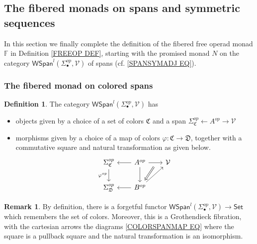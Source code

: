 \documentclass[a4paper,10pt
,draft
]{article}%
\numberwithin{equation}{section}
\numberwithin{figure}{section}
\theoremstyle{definition} %
\newtheorem{definition}[equation]{Definition}%
\newtheorem{remark}[equation]{Remark}%
\newcommand{\1}{\ensuremath{\mathbbm 1}}%
\begin{document}
\subsection{The fibered monads on spans and symmetric sequences} \label{NONEQMON SEC}

In this section we finally complete the definition of the fibered free operad monad
$\mathbb{F}$ in Definition \ref{FREEOP DEF},
starting with the promised monad $N$ on the category $\mathsf{WSpan}^l(\Sigma_{\bullet}^{op},\mathcal{V})$ of spans
(cf. \eqref{SPANSYMADJ EQ}).


\subsubsection*{The fibered monad on colored spans}



\begin{definition}\label{WSPANCAT DEF}
	The category $\mathsf{WSpan}^l(\Sigma_{\bullet}^{op},\mathcal{V})$ has
	\begin{itemize}
		\item objects given by a choice of a set of colors $\mathfrak{C}$
		and a span $\Sigma^{op}_{\mathfrak{C}} \leftarrow A^{op} \rightarrow \mathcal{V}$
		\item morphisms given by a choice of a map of colors
		$\varphi \colon \mathfrak{C} \to \mathfrak{D}$,
		together with a commutative square and natural transformation as given below.
		\begin{equation}\label{COLORSPANMAP EQ}
		\begin{tikzcd}[column sep = 20pt]
		\Sigma_{\mathfrak{C}}^{op}
		\ar{d}[swap]{\varphi^{op}} &
		A^{op}
		\ar{r}[name=U,swap]{} \ar{d} \ar{l} &
		\mathcal{V}	
		\\
		\Sigma_{\mathfrak{D}}^{op}
		&
		|[alias=V]|
		B^{op} \ar{l}
		\ar{ru}
		\arrow[Leftarrow, from=V, to=U,shorten >=0.05cm,shorten <=0.1cm]
		\end{tikzcd}
		\end{equation}
	\end{itemize}
\end{definition}



\begin{remark}
	By definition, there is a forgetful functor
	$\mathsf{WSpan}^l(\Sigma_{\bullet}^{op},\mathcal{V}) \to \mathsf{Set}$
	which remembers the set of colors.
	Moreover, this is a Grothendieck fibration, with the cartesian arrows the diagrams \eqref{COLORSPANMAP EQ} where the square is a pullback square and the natural transformation is an isomorphism.
\end{remark}
\end{document}
